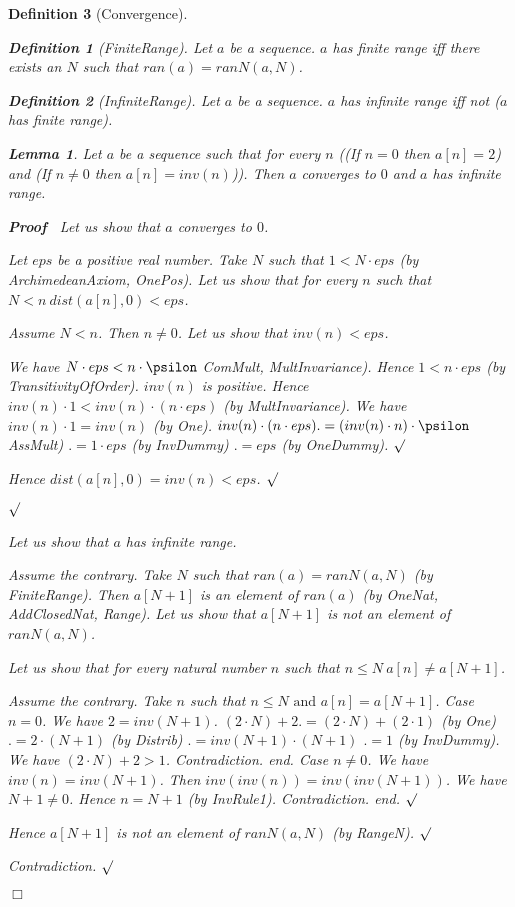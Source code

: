 \documentclass{article}
\newenvironment{forthel}{\begin{leftbar}}{\end{leftbar}}
\newenvironment{proof}{\noindent\textbf{Proof\ }}{\hspace*{\fill}$\Box$\medskip}
\newenvironment{subproof}{\begin{list}{}{}
		\item[\text{Proof}]}{\hfill $\surd$ \end{list}}
\newtheorem{lemma}{Lemma}
\newtheorem{definition}{Definition}
\begin{document}
\begin{forthel}
\begin{definition}[Convergence]
	\begin{definition}[FiniteRange]	Let $a$ be a sequence. $a$ has finite range iff there exists an $N$ such that $ran(a) = ranN(a,N)$.
	\end{definition}

	\begin{definition}[InfiniteRange] Let $a$ be a sequence. $a$ has infinite range iff not ($a$ has finite range).
	\end{definition}
	
	\begin{lemma} Let $a$ be a sequence such that for every $n$
	((If $n = 0$ then $a[n] = 2$) and (If $n \neq 0$ then $a[n] = inv(n)$)).
	Then $a$ converges to $0$ and $a$ has infinite range.
	\end{lemma}
	\begin{proof} Let us show that $a$ converges to $0$.
	\begin{subproof}
	Let $eps$ be a positive real number. 
	Take $N$ such that $1 < N \cdot eps$ (by ArchimedeanAxiom, OnePos).
	Let us show that for every $n$ such that $N < n \ dist(a[n],0) < eps$.
	\begin{subproof}
	Assume $N < n$. Then $n \neq 0$.
	Let us show that $inv(n) < eps$.
	\begin{subproof}
	We have $N \cdot eps < n \cdot \psilon$ ComMult, MultInvariance).
	Hence $1 < n \cdot eps$ (by TransitivityOfOrder).
	$inv(n)$ is positive.
	Hence $inv(n) \cdot 1 < inv(n) \cdot (n \cdot eps)$ (by MultInvariance).
	We have $inv(n) \cdot 1 = inv(n)$ (by One).
	$inv(n) \cdot (n \cdot eps) .= (inv(n) \cdot n) \cdot \psilon$ AssMult)
	$.= 1 \cdot eps$ (by InvDummy)
	$.= eps$ (by OneDummy).
	\end{subproof}
	Hence $dist(a[n],0) = inv(n) < eps$.
	\end{subproof}
	\end{subproof}
	Let us show that $a$ has infinite range.
	\begin{subproof}
	Assume the contrary.
	Take $N$ such that $ran(a) = ranN(a,N)$ (by FiniteRange).
	Then $a[N + 1]$ is an element of $ran(a)$ (by OneNat, AddClosedNat, Range).
	Let us show that $a[N + 1]$ is not an element of $ranN(a,N)$.
	\begin{subproof}
	Let us show that for every natural number $n$ such that $n \leq N \ a[n] \neq a[N + 1]$.
	\begin{subproof}
	Assume the contrary.
	Take $n$ such that $n \leq N \text{ and } a[n] = a[N + 1]$.
	Case $n = 0$.
	We have $2 = inv(N + 1)$.
	$(2 \cdot N) + 2 .= (2 \cdot N) + (2 \cdot 1)$ (by One)
	$.= 2 \cdot (N + 1)$ (by Distrib)
	$.= inv(N + 1) \cdot (N + 1)$
	$.= 1$ (by InvDummy).
	We have $(2 \cdot N) + 2 > 1$.
	Contradiction.
	end.
	Case $n \neq 0$.
	We have $inv(n) = inv(N + 1)$.
	Then $inv(inv(n)) = inv(inv(N + 1))$.
	We have $N + 1 \neq 0$.
	Hence $n = N + 1$ (by InvRule1).
	Contradiction.
	end.
	\end{subproof}
	Hence $a[N + 1]$ is not an element of $ranN(a,N)$ (by RangeN).
	\end{subproof}
	Contradiction.
	\end{subproof}
	\end{proof}
	

\end{definition}
\end{forthel}
\end{document}
